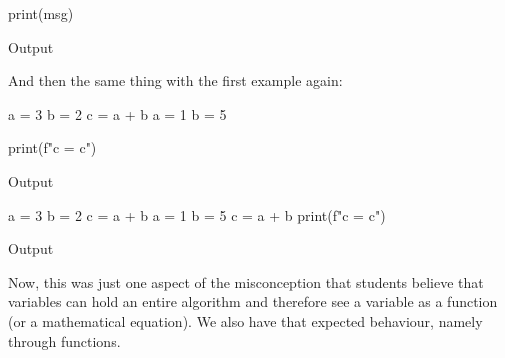 \begin{description}
\begin{frame}[fragile]
\begin{minipage}[t]{0.45\columnwidth}
\begin{pyblock}[varstateG2][highlightlines=5]
print(msg)
        \end{pyblock}
        \begin{block}{Output}\printpythontex[verbatim]\end{block}
      \end{minipage}
      \end{frame}

      And then the same thing with the first example again:

      \begin{frame}[fragile]
      \begin{minipage}[t]{0.45\columnwidth}
        \begin{pyblock}[varstateG1]
a = 3
b = 2
c = a + b
a = 1
b = 5

print(f"c = {c}")
        \end{pyblock}
        \begin{block}{Output}\printpythontex[verbatim]\end{block}
      \end{minipage}
      \hfill
      \begin{minipage}[t]{0.45\columnwidth}
        \begin{pyblock}[varstateG1][highlightlines=6]
a = 3
b = 2
c = a + b
a = 1
b = 5
c = a + b
print(f"c = {c}")
        \end{pyblock}
        \begin{block}{Output}\printpythontex[verbatim]\end{block}
      \end{minipage}
      \end{frame}
\end{description}

Now, this was just one aspect of the misconception that students believe that 
variables can hold an entire algorithm and therefore see a variable as a 
function (or a mathematical equation).
We also have that expected behaviour, namely through functions.

